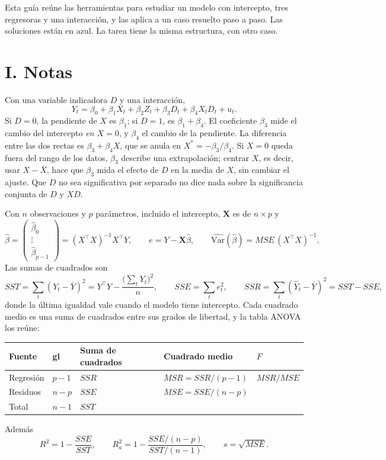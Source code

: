 \documentclass[11pt,letterpaper]{article}
\begin{document}

Esta guía reúne las herramientas para estudiar un modelo con intercepto, tres regresoras y una interacción, y las aplica a un caso resuelto paso a paso. Las soluciones están en {\color{azul}azul}. La tarea tiene la misma estructura, con otro caso.

\section*{I. Notas}

 Con una variable indicadora $D$ y una interacción,
\[
Y_t=\beta_0+\beta_1X_t+\beta_2Z_t+\beta_3D_t+\beta_4X_tD_t+u_t.
\]
Si $D=0$, la pendiente de $X$ es $\beta_1$; si $D=1$, es $\beta_1+\beta_4$. El coeficiente $\beta_3$ mide el cambio del intercepto \emph{en $X=0$}, y $\beta_4$ el cambio de la pendiente. La diferencia entre las dos rectas es $\beta_3+\beta_4X$, que se anula en $X^*=-\beta_3/\beta_4$. Si $X=0$ queda fuera del rango de los datos, $\beta_3$ describe una extrapolación; centrar $X$, es decir, usar $X-\bar X$, hace que $\beta_3$ mida el efecto de $D$ en la media de $X$, sin cambiar el ajuste. Que $D$ no sea significativa por separado no dice nada sobre la significancia conjunta de $D$ y $XD$.

 Con $n$ observaciones y $p$ parámetros, incluido el intercepto, $\mathbf X$ es de $n\times p$ y
\[
\hat\beta=\begin{pmatrix}\hat\beta_0\\\vdots\\\hat\beta_{p-1}\end{pmatrix}=(X^\top X)^{-1}X^\top Y,\qquad e=Y-\mathbf X\hat\beta,\qquad \widehat{\mathrm{Var}}(\hat\beta)=MSE\,(X^\top X)^{-1}.
\]
Las sumas de cuadrados son
\[
SST=\sum_t(Y_t-\bar Y)^2=Y^\top Y-\frac{\bigl(\sum_tY_t\bigr)^2}{n},\qquad SSE=\sum_te_t^2,\qquad SSR=\sum_t(\hat Y_t-\bar Y)^2=SST-SSE,
\]
donde la última igualdad vale cuando el modelo tiene intercepto. Cada cuadrado medio es una suma de cuadrados entre sus grados de libertad, y la tabla ANOVA los reúne:
\begin{center}
\begin{tabular}{@{}llll l@{}}
\toprule
Fuente & gl & Suma de cuadrados & Cuadrado medio & $F$\\
\midrule
Regresión & $p-1$ & $SSR$ & $MSR=SSR/(p-1)$ & $MSR/MSE$\\
Residuos & $n-p$ & $SSE$ & $MSE=SSE/(n-p)$ & \\
Total & $n-1$ & $SST$ & & \\
\bottomrule
\end{tabular}
\end{center}
Además
\[
R^2=1-\frac{SSE}{SST},\qquad R^2_a=1-\frac{SSE/(n-p)}{SST/(n-1)},\qquad s=\sqrt{MSE}.
\]
\end{document}
